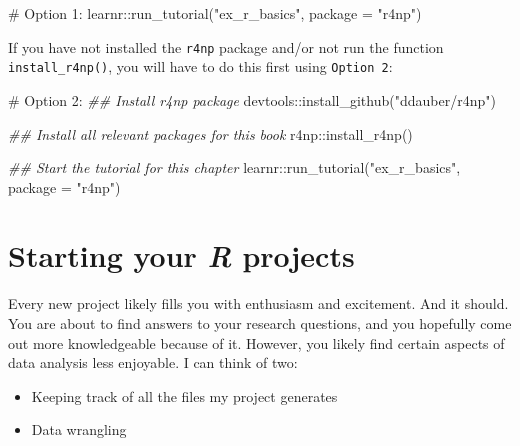 \documentclass[
  letterpaper,
  DIV=11,
  numbers=noendperiod]{scrreprt}
\newenvironment{Shaded}{\begin{snugshade}}{\end{snugshade}}
\newcommand{\AttributeTok}[1]{\textcolor[rgb]{0.40,0.45,0.13}{#1}}
\newcommand{\CommentTok}[1]{\textcolor[rgb]{0.37,0.37,0.37}{#1}}
\newcommand{\DocumentationTok}[1]{\textcolor[rgb]{0.37,0.37,0.37}{\textit{#1}}}
\newcommand{\FunctionTok}[1]{\textcolor[rgb]{0.28,0.35,0.67}{#1}}
\newcommand{\NormalTok}[1]{\textcolor[rgb]{0.00,0.23,0.31}{#1}}
\newcommand{\SpecialCharTok}[1]{\textcolor[rgb]{0.37,0.37,0.37}{#1}}
\newcommand{\StringTok}[1]{\textcolor[rgb]{0.13,0.47,0.30}{#1}}
\begin{document}
\begin{Shaded}
\begin{Highlighting}[]
\CommentTok{\# Option 1:}
\NormalTok{learnr}\SpecialCharTok{::}\FunctionTok{run\_tutorial}\NormalTok{(}\StringTok{"ex\_r\_basics"}\NormalTok{, }\AttributeTok{package =} \StringTok{"r4np"}\NormalTok{)}
\end{Highlighting}
\end{Shaded}

If you have not installed the \texttt{r4np} package and/or not run the
function \texttt{install\_r4np()}, you will have to do this first using
\texttt{Option\ 2}:

\begin{Shaded}
\begin{Highlighting}[]
\CommentTok{\# Option 2:}
\DocumentationTok{\#\# Install \textquotesingle{}r4np\textquotesingle{} package}
\NormalTok{devtools}\SpecialCharTok{::}\FunctionTok{install\_github}\NormalTok{(}\StringTok{"ddauber/r4np"}\NormalTok{)}

\DocumentationTok{\#\# Install all relevant packages for this book}
\NormalTok{r4np}\SpecialCharTok{::}\FunctionTok{install\_r4np}\NormalTok{()}

\DocumentationTok{\#\# Start the tutorial for this chapter}
\NormalTok{learnr}\SpecialCharTok{::}\FunctionTok{run\_tutorial}\NormalTok{(}\StringTok{"ex\_r\_basics"}\NormalTok{, }\AttributeTok{package =} \StringTok{"r4np"}\NormalTok{)}
\end{Highlighting}
\end{Shaded}


\chapter{\texorpdfstring{Starting your \emph{R}
projects}{Starting your R projects}}\label{sec-starting-your-r-projects}

Every new project likely fills you with enthusiasm and excitement. And
it should. You are about to find answers to your research questions, and
you hopefully come out more knowledgeable because of it. However, you
likely find certain aspects of data analysis less enjoyable. I can think
of two:

\begin{itemize}
\item
  Keeping track of all the files my project generates
\item
  Data wrangling
\end{itemize}
\end{document}
